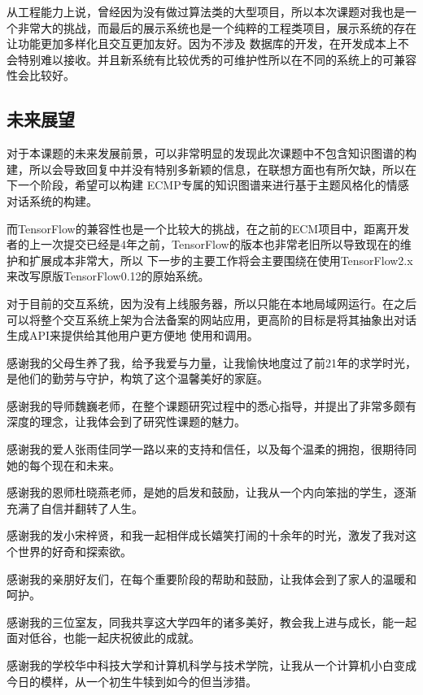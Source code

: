 \documentclass[supercite]{HustGraduPaper}
\theoremstyle{definition}
\begin{document}
从工程能力上说，曾经因为没有做过算法类的大型项目，所以本次课题对我也是一个非常大的挑战，而最后的展示系统也是一个纯粹的工程类项目，展示系统的存在让功能更加多样化且交互更加友好。因为不涉及
数据库的开发，在开发成本上不会特别难以接收。并且新系统有比较优秀的可维护性所以在不同的系统上的可兼容性会比较好。

\subsection{未来展望}
对于本课题的未来发展前景，可以非常明显的发现此次课题中不包含知识图谱的构建，所以会导致回复中并没有特别多新颖的信息，在联想方面也有所欠缺，所以在下一个阶段，希望可以构建
ECMP专属的知识图谱来进行基于主题风格化的情感对话系统的构建。

而TensorFlow的兼容性也是一个比较大的挑战，在之前的ECM项目中，距离开发者的上一次提交已经是4年之前，TensorFlow的版本也非常老旧所以导致现在的维护和扩展成本非常大，所以
下一步的主要工作将会主要围绕在使用TensorFlow2.x来改写原版TensorFlow0.12的原始系统。

对于目前的交互系统，因为没有上线服务器，所以只能在本地局域网运行。在之后可以将整个交互系统上架为合法备案的网站应用，更高阶的目标是将其抽象出对话生成API来提供给其他用户更方便地
使用和调用。


\begin{thankpage}
感谢我的父母生养了我，给予我爱与力量，让我愉快地度过了前21年的求学时光，是他们的勤劳与守护，构筑了这个温馨美好的家庭。

感谢我的导师魏巍老师，在整个课题研究过程中的悉心指导，并提出了非常多颇有深度的理念，让我体会到了研究性课题的魅力。

感谢我的爱人张雨佳同学一路以来的支持和信任，以及每个温柔的拥抱，很期待同她的每个现在和未来。

感谢我的恩师杜晓燕老师，是她的启发和鼓励，让我从一个内向笨拙的学生，逐渐充满了自信并翻转了人生。

感谢我的发小宋梓贤，和我一起相伴成长嬉笑打闹的十余年的时光，激发了我对这个世界的好奇和探索欲。

感谢我的亲朋好友们，在每个重要阶段的帮助和鼓励，让我体会到了家人的温暖和呵护。

感谢我的三位室友，同我共享这大学四年的诸多美好，教会我上进与成长，能一起面对低谷，也能一起庆祝彼此的成就。

感谢我的学校华中科技大学和计算机科学与技术学院，让我从一个计算机小白变成今日的模样，从一个初生牛犊到如今的但当涉猎。

\end{thankpage}

\nocite{*}


\end{document}
